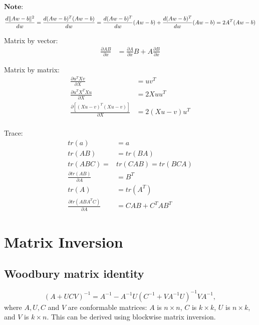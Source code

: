 \documentclass[11pt]{elegantbook}
\begin{document}
$\textbf{Note:}$ $$\frac{d\|Aw-b\|^2}{dw}
=\frac{d(Aw-b)^T(Aw-b)}{dw}
\\=\frac{d(Aw-b)^T}{dw}(Aw-b)+\frac{d(Aw-b)^T}{dw}(Aw-b)
\\=2A^T(Aw-b)$$

Matrix by vector:
\begin{equation}
    \begin{aligned}
        \frac{\partial AB}{\partial x}&=\frac{\partial A}{\partial x}B+A\frac{\partial B}{\partial x}
    \end{aligned}
    \nonumber
\end{equation}

Matrix by matrix:
\begin{equation}
    \begin{aligned}
        \frac{\partial u^TXv}{\partial X}&=uv^T\\
        \frac{\partial u^TX^TXu}{\partial X}&=2Xuu^T\\
        \frac{\partial [(Xu-v)^T(Xu-v)]}{\partial X}&=2(Xu-v)u^T\\
    \end{aligned}
    \nonumber
\end{equation}

Trace:
\begin{equation}
    \begin{aligned}
        tr(a)&=a\\
        tr(AB)&=tr(BA)\\
        tr(ABC)=&tr(CAB)=tr(BCA)\\
        \frac{\partial tr(AB)}{\partial A}&=B^T\\
        tr(A)&=tr(A^T)\\
        \frac{\partial tr(ABA^TC)}{\partial A}&=CAB+C^TAB^T
    \end{aligned}
    \nonumber
\end{equation}

\section{Matrix Inversion}
\subsection{Woodbury matrix identity}
$${\displaystyle \left(A+UCV\right)^{-1}=A^{-1}-A^{-1}U\left(C^{-1}+VA^{-1}U\right)^{-1}VA^{-1},}$$
where $A, U, C$ and $V$ are conformable matrices: $A$ is $n\times n$, $C$ is $k\times k$, $U$ is $n\times k$, and $V$ is $k\times n$. This can be derived using blockwise matrix inversion.
\end{document}
